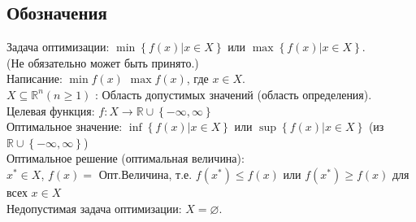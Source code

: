 \subsection{Обозначения}
Задача оптимизации: $\min\left\lbrace f(x)|x\in X\right\rbrace$ или $\max\left\lbrace f(x)|x\in X\right\rbrace$.\\
(Не обязательно может быть принято.)\\
Написание: $\min{f(x)}$ $\max{f(x)}$, где $x\in X$.\\
$X\subseteq \mathbb{R}^{n} (n\geq 1)$ : Область допустимых значений (область определения).\\
Целевая функция: $f: X\rightarrow \mathbb{R}\cup\left\lbrace -\infty,\infty \right\rbrace$\\
Оптимальное значение: $\inf\left\lbrace f(x)|x\in X\right\rbrace$ или $\sup\left\lbrace f(x)|x\in X\right\rbrace$ (из $\mathbb{R}\cup\left\lbrace -\infty,\infty \right\rbrace$)
\\
Оптимальное решение (оптимальная величина):\\
$x^{*}\in X$, $f(x)=$ Опт.Величина, т.е.
$ f(x^{*})\leq f(x)$ или $ f(x^{*})\geq f(x)$ для всех $x\in X$\\
Недопустимая задача оптимизации: $X=\varnothing$.\\

